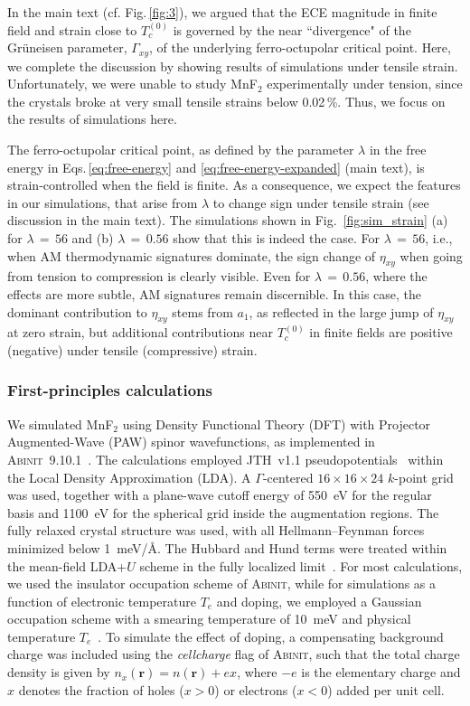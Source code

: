 \documentclass[
 reprint,










 amsmath,amssymb,
 aps,






]{revtex4-2}
\begin{document}
In the main text (cf. Fig.\,\ref{fig:3}), we argued that the ECE magnitude in finite field and strain close to $T_c^{(0)}$ is governed by the near ``divergence" of the Grüneisen parameter, $\Gamma_{xy}$, of the underlying ferro-octupolar critical point. Here, we complete the discussion by showing results of simulations under tensile strain. Unfortunately, we were unable to study MnF$_2$ experimentally under tension, since the crystals broke at very small tensile strains below 0.02\,\%. Thus, we focus on the results of simulations here.

The ferro-octupolar critical point, as defined by the parameter $\lambda$ in the free energy in Eqs.\,\eqref{eq:free-energy} and \eqref{eq:free-energy-expanded} (main text), is strain-controlled when the field is finite. As a consequence, we expect the features in our simulations, that arise from $\lambda$ to change sign under tensile strain (see discussion in the main text). The simulations shown in Fig.~\ref{fig:sim_strain} (a) for $\lambda\,=\,56$ and (b) $\lambda\,=\,0.56$ show that this is indeed the case. For $\lambda\,=\,56$, i.e., when AM thermodynamic signatures dominate, the sign change of $\eta_{xy}$ when going from tension to compression is clearly visible. Even for $\lambda\,=\,0.56$, where the effects are more subtle, AM signatures remain discernible. In this case, the dominant contribution to $\eta_{xy}$ stems from $a_1$, as reflected in the large jump of $\eta_{xy}$ at zero strain, but additional contributions near $T_c^{(0)}$ in finite fields are positive (negative) under tensile (compressive) strain.

\subsubsection{First-principles calculations}
\label{sec:DFT-methods}
We simulated MnF$_2$ using Density Functional Theory (DFT) with Projector Augmented-Wave (PAW) spinor wavefunctions, as implemented in \textsc{Abinit}~9.10.1~\cite{Torrent2008Apr, Marques2012Oct, Gonze2016Aug, Gonze2020Mar, Romero2020Mar}. The calculations employed JTH~v1.1 pseudopotentials~\cite{Jollet2014Apr} within the Local Density Approximation (LDA). A $\Gamma$-centered $16\times16\times24$ $k$-point grid was used, together with a plane-wave cutoff energy of 550~eV for the regular basis and 1100~eV for the spherical grid inside the augmentation regions. The fully relaxed crystal structure was used, with all Hellmann--Feynman forces minimized below 1~meV/\AA. The Hubbard and Hund terms were treated within the mean-field LDA+$U$ scheme in the fully localized limit~\cite{Amadon2008}. For most calculations, we used the insulator occupation scheme of \textsc{Abinit}, while for simulations as a function of electronic temperature $T_e$ and doping, we employed a Gaussian occupation scheme with a smearing temperature of 10~meV and physical temperature $T_e$~\cite{Verstraete2001}. To simulate the effect of doping, a compensating background charge was included using the \textit{cellcharge} flag of \textsc{Abinit}, such that the total charge density is given by $n_x(\mathbf{r}) = n(\mathbf{r}) + e x$, where $-e$ is the elementary charge and $x$ denotes the fraction of holes ($x>0$) or electrons ($x<0$) added per unit cell.
\end{document}
